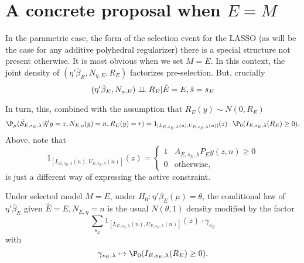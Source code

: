 \documentclass{article}
\newcommand{\OLS}{\bar{\beta}}
\newcommand{\indep}{\perp\kern-5pt\perp}
\begin{document}
        \section{A concrete proposal when $E=M$}



        In the parametric case, the form of the selection event for
        the LASSO (as will be the case for any additive polyhedral
        regularizer) there is a special structure not present
        otherwise. It is most obvious when we set $M=E$. In this
        context, the joint density of $(\eta'\OLS_E, N_{\eta,E}, R_E)$
        factorizes pre-selection. But, crucially
        \begin{equation}
          \label{eq:cond:independence}
          (\eta'\OLS_E, N_{\eta,E}) \indep R_E | \hat{E}=E,
          \hat{s}=s_E
        \end{equation}
        
        In turn, this, combined with the assumption that $R_E(y) \sim
        N(0, R_E)$
        \begin{equation}
          \P_{\mu}(\bar{\cal S}_{E,s_E,\lambda} | \bar{\eta}'y=z,
          N_{E,\eta}(y)=n, R_E(y)=r) = 1_{[L_{E,s_E,\lambda}(n),
              U_{E,s_E,\lambda}(n)]}(z) \cdot \P_{0}(I_{E,s_E,\lambda}(R_E) \geq 0).
        \end{equation}
        Above, note that
        $$ 1_{[L_{E,s_E,\lambda}(n), U_{E,s_E,\lambda}(n)]}(z) = \begin{cases} 1 &
          A_{E,s_E,\lambda}P_Ey(z,n) \geq 0 \\ 0 & \text{otherwise,}
          \end{cases}
        $$ is just a different way of expressing the active
        constraint.
          
        \begin{lemma}
          Under selected model $M=E$, under
          $H_0:\eta'\beta_E(\mu)=\theta$, the conditional law of
          $\eta'\OLS_E$ given $\hat{E}=E, N_{E,\eta}=n$ is the usual
          $N(\theta, 1)$ density modified by the factor
          \begin{equation}
            \label{eq:union}
            \sum_{s_E} 1_{[L_{E,s_E,\lambda}(n), U_{E,s_E,\lambda}(n)]}(z) \cdot
            \gamma_{s_E}
            \end{equation}
          with
        $$ \gamma_{s_E,\lambda} \mapsto \P_0(I_{E,s_E,\lambda}(R_E) \geq 0).
        $$
          \end{lemma}
\end{document}
